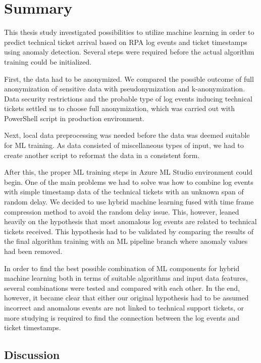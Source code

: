 
\section{Summary}\label{sec:summary}

This thesis study investigated possibilities to utilize machine learning
in order to predict technical ticket arrival
based on RPA log events and ticket timestamps
using anomaly detection.
Several steps were required before the actual algorithm training could be initialized.

First,
the data had to be anonymized.
We compared the possible outcome of full anonymization of sensitive data
with pseudonymization and k-anonymization.
Data security restrictions and the probable type of log events inducing technical tickets
settled us to choose full anonymization,
which was carried out with PowerShell script in production environment.

Next,
local data preprocessing was needed
before the data was deemed suitable for ML training.
As data consisted of miscellaneous types of input,
we had to create another script to reformat the data in a consistent form.

After this,
the proper ML training steps in Azure ML Studio environment could begin.
One of the main problems we had to solve
was how to combine log events with simple timestamp data of the technical tickets
with an unknown span of random delay.
We decided to use hybrid machine learning
fused with time frame compression method
to avoid the random delay issue.
This, however,
leaned heavily on the hypothesis that most anomalous log events
are related to technical tickets received.
This hypothesis had to be validated
by comparing the results of the final algorithm training
with an ML pipeline branch where anomaly values had been removed.

In order to find the best possible combination of ML components for hybrid machine learning
both in terms of suitable algorithms and input data features,
several combinations were tested and compared with each other.
In the end, however,
it became clear that
either our original hypothesis had to be assumed incorrect
and anomalous events are not linked to technical support tickets,
or more studying is required to find the connection between the log events and ticket timestamps.


\subsection{Discussion}\label{subsec:discussion}

